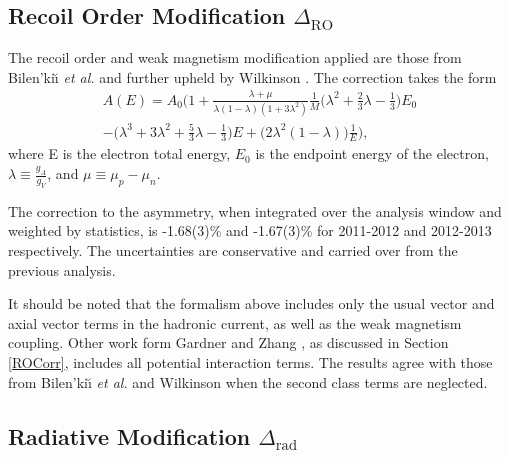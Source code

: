 \subsection{Recoil Order Modification $\Delta_{\mathrm{RO}}$} \label{sssec:sysROCorr}

The recoil order and weak magnetism modification
applied are those from Bilen'ki\u\i \textit{ et al.}
\cite{bilenkii1960} and further upheld by Wilkinson \cite{wilkinson1982}.
The correction takes the form 
%
\begin{multline}
  A(E) = A_0 \bigg(1+ \frac{\lambda+\mu}{\lambda\left(1-\lambda\right)\left(1+3\lambda^2\right)}\frac{1}{M}
  \Big(\lambda^2+\frac{2}{3}\lambda-\frac{1}{3}\Big)E_0 \\
  -\Big(\lambda^3+3\lambda^2+\frac{5}{3}\lambda-\frac{1}{3}\Big)E
  +\Big(2\lambda^2\left(1-\lambda\right)\Big)\frac{1}{E}\bigg),
\end{multline}
%
\noindent where E is the electron total energy, $E_0$ is
the endpoint energy of the electron, $\lambda\equiv\frac{g_A}{g_V}$,
and $\mu\equiv\mu_p-\mu_n$.


The correction to the asymmetry, when integrated over the analysis window
and weighted by statistics, is -1.68(3)\% and -1.67(3)\% for 2011-2012 and
2012-2013 respectively. The uncertainties are conservative and carried over
from the previous analysis.

It should be noted that the formalism above includes only the usual vector and
axial vector terms in the hadronic current, as well as the weak magnetism
coupling. Other work form Gardner and Zhang
\cite{gardner2001}, as discussed in Section \ref{ROCorr}, includes all potential interaction terms.
The results agree with those from Bilen'ki\u\i \textit{ et al.} and Wilkinson when the second class terms
are neglected. 

\subsection{Radiative Modification $\Delta_{\mathrm{rad}}$} \label{sssec:sysRadCorr}

